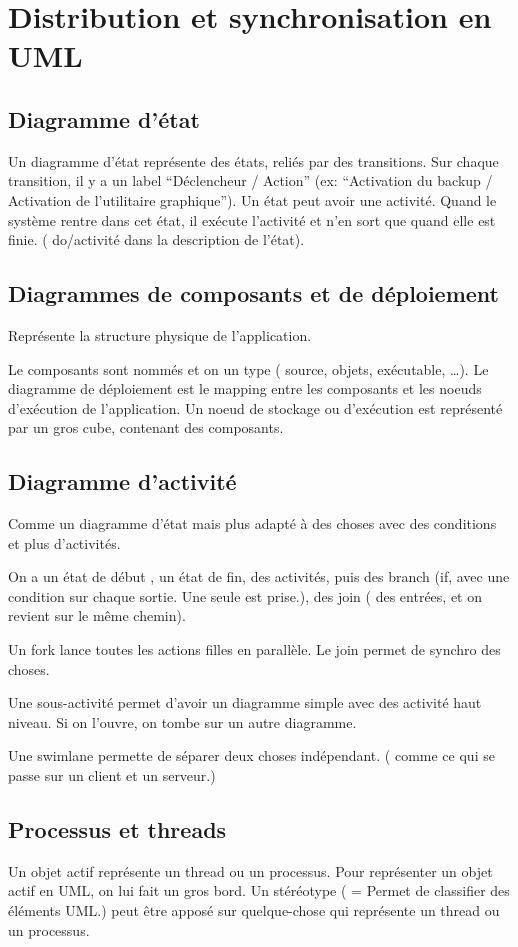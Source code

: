 \section{Distribution et synchronisation en UML}

\subsection{Diagramme d’état}
Un diagramme d’état représente des états, reliés par des transitions.
Sur chaque transition, il y a un label “Déclencheur / Action”
(ex: “Activation du backup / Activation de l’utilitaire graphique”).
Un état peut avoir une activité. Quand le système rentre dans cet état, il exécute l’activité et n’en sort que quand elle est finie. ( do/activité dans la description de l’état).

\subsection{Diagrammes de composants et de déploiement}
Représente la structure physique de l’application.

Le composants sont nommés et on un type ( source, objets, exécutable, …).
Le diagramme de déploiement est le mapping entre les composants et les noeuds d’exécution de l’application.
Un noeud de stockage ou d’exécution est représenté par un gros cube, contenant des composants.

\subsection{Diagramme d’activité}
Comme un diagramme d’état mais plus adapté à des choses avec des conditions et plus d’activités.

On a un état de début , un état de fin, des activités, puis des branch (if, avec une condition sur chaque sortie. Une seule est prise.), des join ( des entrées, et on revient sur le même chemin).

Un fork lance toutes les actions filles en parallèle. Le join permet de synchro des choses.

Une sous-activité permet d’avoir un diagramme simple avec des activité haut niveau. Si on l’ouvre, on tombe sur un autre diagramme.

Une swimlane permette de séparer deux choses indépendant. ( comme ce qui se passe sur un client et un serveur.)

\subsection{Processus et threads}
Un objet actif représente un thread ou un processus.
Pour représenter un objet actif en UML, on lui fait un gros bord.
Un stéréotype ( = Permet de classifier des éléments UML.) peut être apposé sur quelque-chose qui représente un thread ou un processus.

